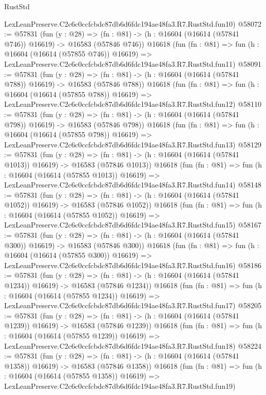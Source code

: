 \begin{lexlean}{RustStd}
\begin{coremodule}
    LexLeanPreserve.C2c6c0ccfcbdc87db6d6fdc194ae48fa3.R7.RustStd.fun10)
@58072 := @57831
    (fun (y : @28) =>
    (fn : @81) -> (h : @16604 (@16614 (@57841 @746)) @16619) -> @16583 (@57846 @746))
    @16618
    (fun (fn : @81) =>
    fun (h : @16604 (@16614 (@57855 @746)) @16619) =>
    LexLeanPreserve.C2c6c0ccfcbdc87db6d6fdc194ae48fa3.R7.RustStd.fun11)
@58091 := @57831
    (fun (y : @28) =>
    (fn : @81) -> (h : @16604 (@16614 (@57841 @788)) @16619) -> @16583 (@57846 @788))
    @16618
    (fun (fn : @81) =>
    fun (h : @16604 (@16614 (@57855 @788)) @16619) =>
    LexLeanPreserve.C2c6c0ccfcbdc87db6d6fdc194ae48fa3.R7.RustStd.fun12)
@58110 := @57831
    (fun (y : @28) =>
    (fn : @81) -> (h : @16604 (@16614 (@57841 @798)) @16619) -> @16583 (@57846 @798))
    @16618
    (fun (fn : @81) =>
    fun (h : @16604 (@16614 (@57855 @798)) @16619) =>
    LexLeanPreserve.C2c6c0ccfcbdc87db6d6fdc194ae48fa3.R7.RustStd.fun13)
@58129 := @57831
    (fun (y : @28) =>
    (fn : @81) -> (h : @16604 (@16614 (@57841 @1013)) @16619) -> @16583 (@57846 @1013))
    @16618
    (fun (fn : @81) =>
    fun (h : @16604 (@16614 (@57855 @1013)) @16619) =>
    LexLeanPreserve.C2c6c0ccfcbdc87db6d6fdc194ae48fa3.R7.RustStd.fun14)
@58148 := @57831
    (fun (y : @28) =>
    (fn : @81) -> (h : @16604 (@16614 (@57841 @1052)) @16619) -> @16583 (@57846 @1052))
    @16618
    (fun (fn : @81) =>
    fun (h : @16604 (@16614 (@57855 @1052)) @16619) =>
    LexLeanPreserve.C2c6c0ccfcbdc87db6d6fdc194ae48fa3.R7.RustStd.fun15)
@58167 := @57831
    (fun (y : @28) =>
    (fn : @81) -> (h : @16604 (@16614 (@57841 @300)) @16619) -> @16583 (@57846 @300))
    @16618
    (fun (fn : @81) =>
    fun (h : @16604 (@16614 (@57855 @300)) @16619) =>
    LexLeanPreserve.C2c6c0ccfcbdc87db6d6fdc194ae48fa3.R7.RustStd.fun16)
@58186 := @57831
    (fun (y : @28) =>
    (fn : @81) -> (h : @16604 (@16614 (@57841 @1234)) @16619) -> @16583 (@57846 @1234))
    @16618
    (fun (fn : @81) =>
    fun (h : @16604 (@16614 (@57855 @1234)) @16619) =>
    LexLeanPreserve.C2c6c0ccfcbdc87db6d6fdc194ae48fa3.R7.RustStd.fun17)
@58205 := @57831
    (fun (y : @28) =>
    (fn : @81) -> (h : @16604 (@16614 (@57841 @1239)) @16619) -> @16583 (@57846 @1239))
    @16618
    (fun (fn : @81) =>
    fun (h : @16604 (@16614 (@57855 @1239)) @16619) =>
    LexLeanPreserve.C2c6c0ccfcbdc87db6d6fdc194ae48fa3.R7.RustStd.fun18)
@58224 := @57831
    (fun (y : @28) =>
    (fn : @81) -> (h : @16604 (@16614 (@57841 @1358)) @16619) -> @16583 (@57846 @1358))
    @16618
    (fun (fn : @81) =>
    fun (h : @16604 (@16614 (@57855 @1358)) @16619) =>
    LexLeanPreserve.C2c6c0ccfcbdc87db6d6fdc194ae48fa3.R7.RustStd.fun19)

\end{coremodule}
\end{lexlean}
